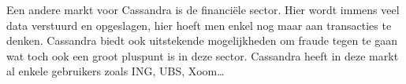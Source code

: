 Een andere markt voor Cassandra is de financiële sector.
Hier wordt immens veel data verstuurd en opgeslagen, hier hoeft men enkel nog maar aan transacties te denken.
Cassandra biedt ook uitstekende mogelijkheden om fraude tegen te gaan wat toch ook een groot pluspunt is in deze sector.
Cassandra heeft in deze markt al enkele gebruikers zoals ING, UBS, Xoom\dots